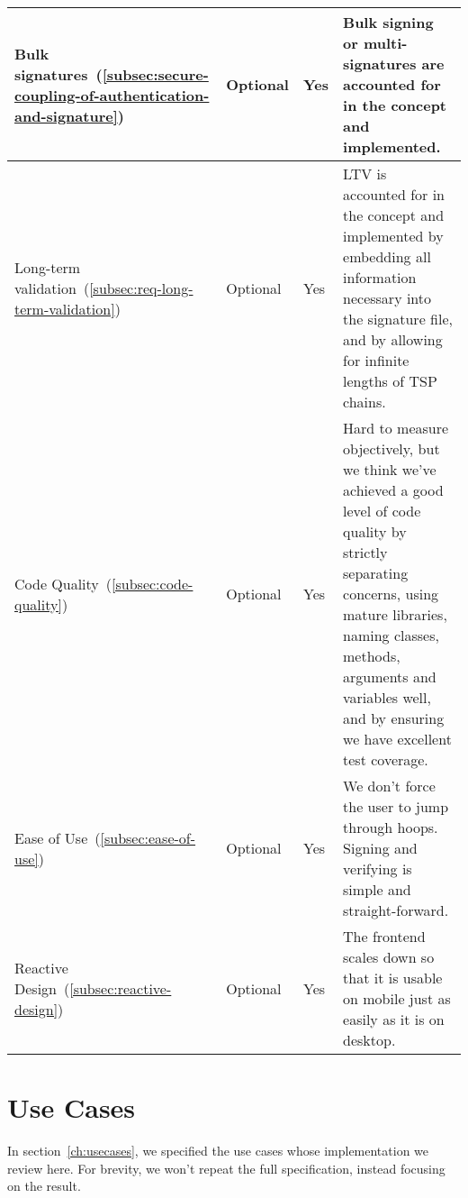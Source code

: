 \begin{center}
\begin{longtable}{p{4.0cm}|p{1.35cm}|p{0.7cm}|p{9.0cm}}
        \\
        \hline
        Bulk signatures~(\ref{subsec:secure-coupling-of-authentication-and-signature})
        & Optional
        & Yes
        & Bulk signing or multi-signatures are accounted for in the concept and implemented.
        \\
        \hline
        Long-term validation~(\ref{subsec:req-long-term-validation})
        & Optional
        & Yes
        & \gls{LTV} is accounted for in the concept and implemented by embedding all information
        necessary into the signature file, and by allowing for infinite lengths of \gls{TSP} chains.
        \\
        \hline
        Code Quality~(\ref{subsec:code-quality})
        & Optional
        & Yes
        & Hard to measure objectively,
        but we think we've achieved a good level of code quality by strictly separating concerns,
        using mature libraries,
        naming classes, methods, arguments and variables well,
        and by ensuring we have excellent test coverage.
        \\
        \hline
        Ease of Use~(\ref{subsec:ease-of-use})
        & Optional
        & Yes
        & We don't force the user to jump through hoops.
        Signing and verifying is simple and straight-forward.
        \\
        \hline
        Reactive Design~(\ref{subsec:reactive-design})
        & Optional
        & Yes
        & The frontend scales down so that it is usable on mobile just as easily as it is on desktop.
        \\
        \hline
    \end{longtable}
\end{center}

\section{Use Cases}\label{subsec:use-cases}
In section~\ref{ch:usecases},
we specified the use cases whose implementation we review here.
For brevity, we won't repeat the full specification,
instead focusing on the result.

